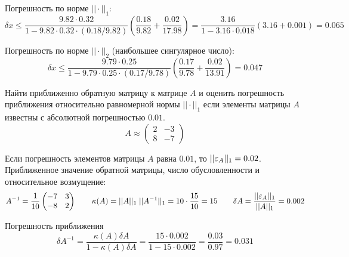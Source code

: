 Погрешность по норме $||\cdot||_1$:
\begin{equation*}
    \delta{x} \leq
    \frac{9.82\cdot{0.32}}{1-9.82\cdot{0.32}\cdot{(0.18/9.82)}}
    \left(\frac{0.18}{9.82} + \frac{0.02}{17.98}\right)
    =
    \frac{3.16}{1 - 3.16\cdot{0.018}} \left(3.16 + 0.001\right)
    =
    0.065
\end{equation*}

Погрешность по норме $||\cdot||_2$ (наибольшее сингулярное число):
\begin{equation*}
    \delta{x} \leq
    \frac{9.79\cdot{0.25}}{1-9.79\cdot{0.25}\cdot{(0.17/9.78)}}
    \left(\frac{0.17}{9.78} + \frac{0.02}{13.91}\right)
    =
    0.047
\end{equation*}


\begin{problem}
    Найти приближенно обратную матрицу к матрице $A$ и оценить погрешность
    приближения относительно равномерной нормы $||\cdot||_1$ если элементы
    матрицы $A$ известны с абсолютной погрешностью $0.01$.
    \begin{equation*}
        A \approx \begin{pmatrix}
            2 & -3\\
            8 & -7
        \end{pmatrix}
    \end{equation*}
\end{problem}


Если погрешность элементов матрицы $A$ равна $0.01$, то $||\varepsilon_A||_1 = 0.02$.
Приближенное значение обратной матрицы, число обусловленности и относительное
возмущение:
\begin{equation*}
    A^{-1} = \frac{1}{10}
    \begin{pmatrix}
        -7 & 3\\
        -8 & 2
    \end{pmatrix}
    \qquad
    \kappa(A) = ||A||_1 \; ||A^{-1}||_1 =  10 \cdot \frac{15}{10} = 15
    \qquad
    \delta{A} = \frac{||\varepsilon_A||_1}{||A||_1} = 0.002
\end{equation*}

Погрешность приближения
\begin{equation*}
    \delta{A^{-1}} = \frac{\kappa(A) \delta{A}}{1 - \kappa(A) \delta{A}}
    =
    \frac{15\cdot{0.002}}{1-15\cdot{0.002}} = \frac{0.03}{0.97} = 0.031
\end{equation*}


